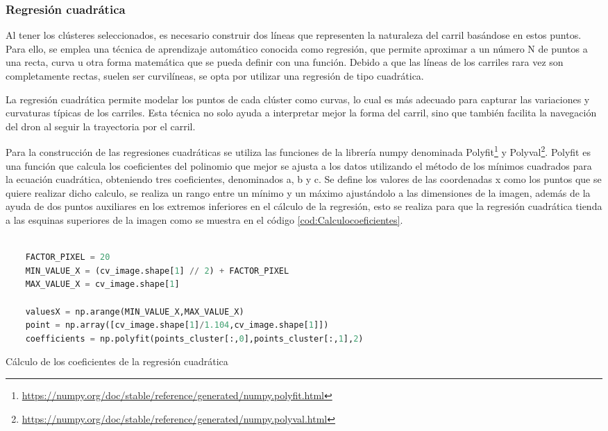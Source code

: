 \subsubsection{Regresión cuadrática}
\label{sec:Regresión cuadrática}
Al tener los clústeres seleccionados, es necesario construir dos líneas que representen la naturaleza del carril basándose en estos puntos. Para ello, se emplea una técnica de aprendizaje 
automático conocida como regresión, que permite aproximar a un número N de puntos a una recta, curva u otra forma matemática que se pueda definir con una función. 
Debido a que las líneas de los carriles rara vez son 
completamente rectas, suelen ser curvilíneas, se opta por utilizar una regresión de tipo cuadrática. 

La regresión cuadrática permite modelar los puntos de cada clúster como curvas, lo cual es más adecuado para capturar las variaciones y curvaturas típicas de los carriles. Esta técnica no solo
ayuda a interpretar mejor la forma del carril, sino que también facilita la navegación del dron al seguir la trayectoria por el carril. \newline

Para la construcción de las regresiones cuadráticas se utiliza las funciones de la librería numpy denominada Polyfit\footnote{\url{https://numpy.org/doc/stable/reference/generated/numpy.polyfit.html}}
y Polyval\footnote{\url{ https://numpy.org/doc/stable/reference/generated/numpy.polyval.html}}. 
Polyfit es una función que calcula los coeficientes del polinomio que mejor se ajusta a los datos utilizando el método de los mínimos 
cuadrados para la ecuación cuadrática, obteniendo tres coeficientes, denominados a, b y c. Se define los valores de las coordenadas x como los puntos que se quiere
realizar dicho calculo, se realiza un rango entre un mínimo y un máximo ajustándolo a las dimensiones de la imagen, además de la ayuda de 
dos puntos auxiliares en los extremos inferiores en el cálculo de la regresión, esto se realiza para que la regresión cuadrática tienda a las esquinas superiores de la imagen 
como se muestra en el código \ref{cod:Calculocoeficientes}.
 \newline

\begin{code}[H]
  \begin{lstlisting}[language=Python]
  
    FACTOR_PIXEL = 20
    MIN_VALUE_X = (cv_image.shape[1] // 2) + FACTOR_PIXEL
    MAX_VALUE_X = cv_image.shape[1]
  
    valuesX = np.arange(MIN_VALUE_X,MAX_VALUE_X) 
    point = np.array([cv_image.shape[1]/1.104,cv_image.shape[1]])
    coefficients = np.polyfit(points_cluster[:,0],points_cluster[:,1],2)
  \end{lstlisting}
  \caption[Calculo de los coeficientes]{Cálculo de los coeficientes de la regresión cuadrática}
  \label{cod:Calculocoeficientes}
  \end{code}  

